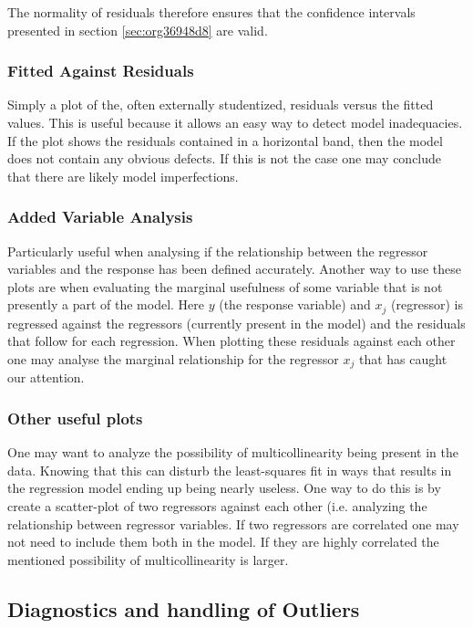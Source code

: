 \documentclass[11pt]{article}
\begin{document}
The normality of residuals therefore ensures that the confidence intervals presented in section \ref{sec:org36948d8}
are valid.

\subsubsection{Fitted Against Residuals}
\label{sec:org6ffabf0}

Simply a plot of the, often externally studentized, residuals versus the fitted values. This is useful
because it allows an easy way to detect model inadequacies. If the plot shows the residuals contained in
a horizontal band, then the model does not contain any obvious defects. If this is not the case one may
conclude that there are likely model imperfections.
\subsubsection{Added Variable Analysis}
\label{sec:org4b6d456}

Particularly useful when analysing if the relationship between the regressor variables and the response
has been defined accurately. Another way to use these plots are when evaluating the marginal usefulness
of some variable that is not presently a part of the model. Here \(y\) (the response variable) and \(x_j\)
(regressor) is regressed against the regressors (currently present in the model) and the residuals that
follow for each regression. When plotting these residuals against each other one may analyse the marginal
relationship for the regressor \(x_j\) that has caught our attention.

\subsubsection{Other useful plots}
\label{sec:org9344ff4}

One may want to analyze the possibility of multicollinearity being present in the data. Knowing that
this can disturb the least-squares fit in ways that results in the regression model ending up being
nearly useless. One way to do this is by create a scatter-plot of two regressors against each other
(i.e. analyzing the relationship between regressor variables. If two regressors are correlated one 
may not need to include them both in the model. If they are highly correlated the mentioned possibility 
of multicollinearity is larger. 

\subsection{Diagnostics and handling of Outliers}
\label{sec:org93dfea0}
\end{document}
